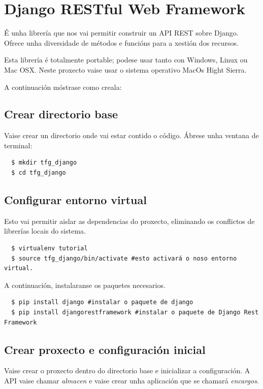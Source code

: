 \documentclass[11pt,twoside]{book}
\begin{document}
\section{Django RESTful Web Framework}

É unha librería que nos vai permitir construir un API REST sobre Django. Ofrece unha diversidade de métodos e funcións para a xestión dos recursos.

Esta librería é totalmente portable; podese usar tanto con Windows, Linux ou Mac OSX. Neste proxecto vaise usar o sistema operativo MacOs Hight Sierra.

A continuación móstrase como creala:

\subsection{Crear directorio base}

Vaise crear un directorio onde vai estar contido o código. Ábrese unha ventana de terminal:

\begin{verbatim}
  $ mkdir tfg_django
  $ cd tfg_django
\end{verbatim}

\subsection{Configurar entorno virtual}

Esto vai permitir aislar as dependencias do proxecto, eliminando os conflictos de librerías locais do sistema.
\begin{verbatim}
  $ virtualenv tutorial
  $ source tfg_django/bin/activate #esto activará o noso entorno virtual.
\end{verbatim}

A continuación, instalaranse os paquetes necesarios.

\begin{verbatim}
  $ pip install django #instalar o paquete de django
  $ pip install djangorestframework #instalar o paquete de Django Rest Framework
\end{verbatim}

\subsection{Crear proxecto e configuración inicial}

Vaise crear o proxecto dentro do directorio base e inicializar a configuración. A API vaise chamar \textit{almacen} e vaise crear unha aplicación que se chamará \textit{encargos}.
\end{document}
